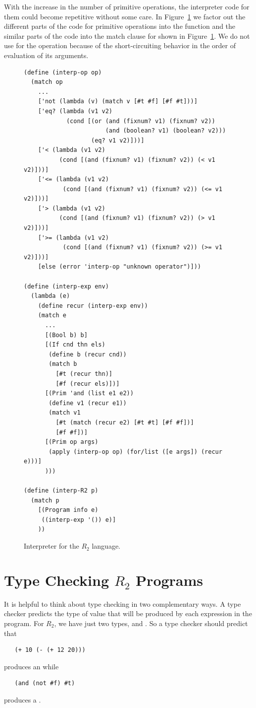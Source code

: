 \documentclass[11pt]{book}
\begin{document}
With the increase in the number of primitive operations, the
interpreter code for them could become repetitive without some
care. In Figure~\ref{fig:interp-R2} we factor out the different parts
of the code for primitive operations into the 
function and the similar parts of the code into the match clause for
 shown in Figure~\ref{fig:interp-R2}. We do not use
 for the  operation because of the
short-circuiting behavior in the order of evaluation of its arguments.


\begin{figure}[tbp]
\begin{lstlisting}
(define (interp-op op)
  (match op
    ...
    ['not (lambda (v) (match v [#t #f] [#f #t]))]
    ['eq? (lambda (v1 v2)
            (cond [(or (and (fixnum? v1) (fixnum? v2))
                       (and (boolean? v1) (boolean? v2)))
                   (eq? v1 v2)]))]
    ['< (lambda (v1 v2)
          (cond [(and (fixnum? v1) (fixnum? v2)) (< v1 v2)]))]
    ['<= (lambda (v1 v2)
           (cond [(and (fixnum? v1) (fixnum? v2)) (<= v1 v2)]))]
    ['> (lambda (v1 v2)
          (cond [(and (fixnum? v1) (fixnum? v2)) (> v1 v2)]))]
    ['>= (lambda (v1 v2)
           (cond [(and (fixnum? v1) (fixnum? v2)) (>= v1 v2)]))]
    [else (error 'interp-op "unknown operator")]))

(define (interp-exp env)
  (lambda (e)
    (define recur (interp-exp env))
    (match e
      ...
      [(Bool b) b]
      [(If cnd thn els)
       (define b (recur cnd))
       (match b
         [#t (recur thn)]
         [#f (recur els)])]
      [(Prim 'and (list e1 e2))
       (define v1 (recur e1))
       (match v1
         [#t (match (recur e2) [#t #t] [#f #f])]
         [#f #f])]
      [(Prim op args)
       (apply (interp-op op) (for/list ([e args]) (recur e)))]
      )))

(define (interp-R2 p)
  (match p
    [(Program info e)
     ((interp-exp '()) e)]
    ))
\end{lstlisting}
\caption{Interpreter for the $R_2$ language.}
\label{fig:interp-R2}
\end{figure}


\section{Type Checking $R_2$ Programs}
\label{sec:type-check-r2}

It is helpful to think about type checking in two complementary
ways. A type checker predicts the type of value that will be produced
by each expression in the program.  For $R_2$, we have just two types,
 and . So a type checker should predict that
\begin{lstlisting}
   (+ 10 (- (+ 12 20)))
\end{lstlisting}
produces an  while
\begin{lstlisting}
   (and (not #f) #t)
\end{lstlisting}
produces a .
\end{document}
